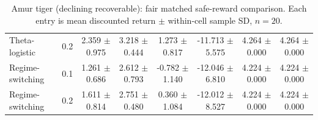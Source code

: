 \documentclass[10pt]{article}
\begin{document}
\begin{table}[p]
\begin{tabular}{@{}lc*{6}{c}@{}}
Theta-logistic & 0.2 & \shortstack{2.359\\$\pm$ 0.975} & \shortstack{3.218\\$\pm$ 0.444} & \shortstack{1.273\\$\pm$ 0.817} & \shortstack{-11.713\\$\pm$ 5.575} & \shortstack{4.264\\$\pm$ 0.000} & \shortstack{4.264\\$\pm$ 0.000} \\
\addlinespace[1.5pt]
Regime-switching & 0.1 & \shortstack{1.261\\$\pm$ 0.686} & \shortstack{2.612\\$\pm$ 0.793} & \shortstack{-0.782\\$\pm$ 1.140} & \shortstack{-12.046\\$\pm$ 6.810} & \shortstack{4.224\\$\pm$ 0.000} & \shortstack{4.224\\$\pm$ 0.000} \\
Regime-switching & 0.2 & \shortstack{1.611\\$\pm$ 0.814} & \shortstack{2.751\\$\pm$ 0.480} & \shortstack{0.360\\$\pm$ 1.084} & \shortstack{-12.012\\$\pm$ 8.527} & \shortstack{4.224\\$\pm$ 0.000} & \shortstack{4.224\\$\pm$ 0.000} \\
\bottomrule
\end{tabular}
\caption{Amur tiger (declining recoverable): fair matched safe-reward comparison. Each entry is mean discounted return $\pm$ within-cell sample SD, $n=20$.}
\end{table}
\end{document}
